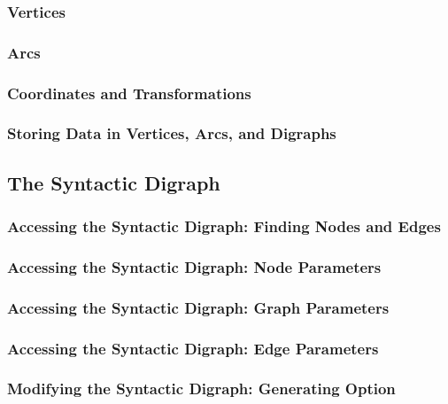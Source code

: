 \subsubsection{Vertices}

\subsubsection{Arcs}
\label{section-gd-arc-model}

\subsubsection{Coordinates and Transformations}

\subsubsection{Storing Data in Vertices, Arcs, and Digraphs}



\subsection{The Syntactic Digraph}

\label{section-gd-syntactic-digraph}


\subsubsection{Accessing the Syntactic Digraph: Finding Nodes and Edges}

\subsubsection{Accessing the Syntactic Digraph: Node Parameters}

\subsubsection{Accessing the Syntactic Digraph: Graph Parameters}

\subsubsection{Accessing the Syntactic Digraph: Edge Parameters}

\subsubsection{Modifying the Syntactic Digraph: Generating Option}

